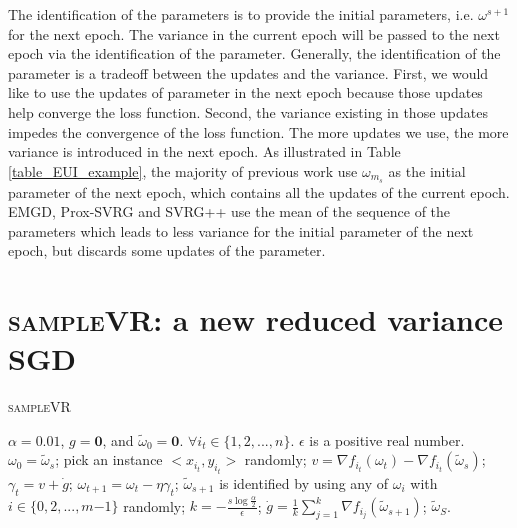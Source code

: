 \documentclass[letterpaper]{article}
\begin{document}
The identification of the parameters is to provide the initial parameters, i.e. $\omega^{s+1}$ for the next epoch. The variance in the current epoch will be passed to the next epoch via the identification of the parameter. Generally, the identification of the parameter is a tradeoff between the updates and the variance. First, we would like to use the updates of parameter  in the next epoch because those updates help converge the loss function. Second, the variance existing in those updates impedes the convergence of the loss function. The more updates we use, the more variance is introduced in the next epoch. As illustrated in Table \ref{table_EUI_example},  the majority of previous work use $\omega_{m_s}$ as the initial parameter of the next epoch, which contains all the updates of the current epoch. EMGD, Prox-SVRG and SVRG++ use the mean of the sequence of the parameters which leads to less variance for the initial parameter of the next epoch, but discards some updates of the parameter. 




\section{\textsc{sampleVR}: a new reduced variance SGD}
\label{sect_sample_vr}

\begin{algorithm}[t]
    \caption{\textsc{sampleVR}}
    \label{algorithm_sampleVR}
    \begin{algorithmic}[1]
        \Require $\alpha=0.01$,  $g=\mathbf{0}$, and $\tilde{\omega}_0=\mathbf{0}$. $\forall i_t\in\{1,2, ..., n\}$.   $\epsilon$ is a positive real number.
            \State $\omega_0=\tilde{\omega}_s$;
                \State pick an instance $\mathrm{<}x_{i_t},y_{i_t}\mathrm{>}$ randomly;
                \State  $v=\nabla f_{i_t}(\omega_t)-\nabla f_{i_t}(\tilde{\omega}_s)$;
                \State $\gamma_{t}=v+\dot{g}$;
                \State $\omega_{t+1} = \omega_t - \eta \gamma_{t}$;
            \EndFor
            \State $\tilde{\omega}_{s+1}$ is identified by using any of $\omega_{i}$ with $i\mathrm{\in}\{0,2, ..., m\mathrm{-}1\}$ randomly;
            \State $k=-\frac{s\log\frac{\alpha}{2}}{\epsilon}$;
            \State $\dot{g} =\frac{1}{k}\sum\limits_{j=1}^{k}\nabla f_{i_j}(\tilde{\omega}_{s+1})$;
          \EndFor
        \Return $\tilde{\omega}_S$.
    \end{algorithmic}
\end{algorithm}
\end{document}
